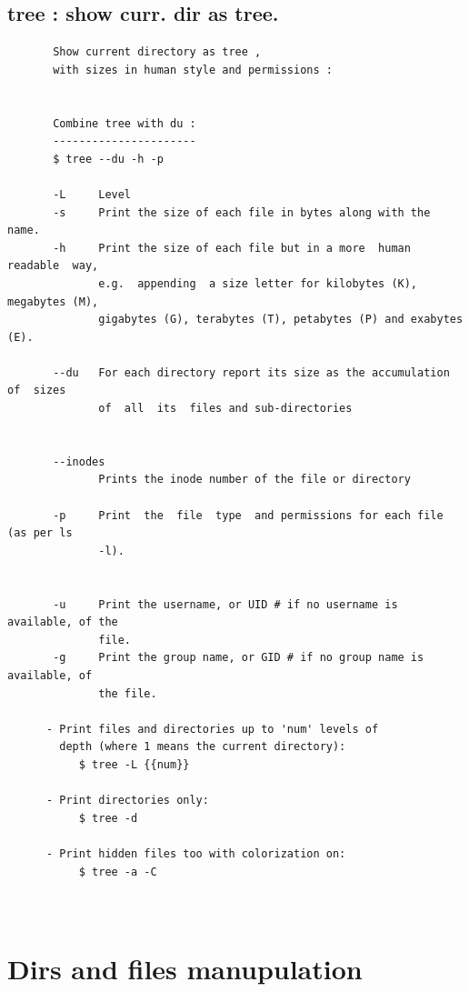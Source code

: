 \documentclass[a4paper,12pt]{article}
\begin{document}
\subsection{tree    : show curr. dir as tree.}
\begin{verbatim}
       Show current directory as tree , 
       with sizes in human style and permissions : 
       
       
       Combine tree with du : 
       ----------------------        
       $ tree --du -h -p       
       
       -L     Level
       -s     Print the size of each file in bytes along with the name.
       -h     Print the size of each file but in a more  human  readable  way,
              e.g.  appending  a size letter for kilobytes (K), megabytes (M),
              gigabytes (G), terabytes (T), petabytes (P) and exabytes (E).             
       
       --du   For each directory report its size as the accumulation of  sizes
              of  all  its  files and sub-directories
              

       --inodes
              Prints the inode number of the file or directory
       
       -p     Print  the  file  type  and permissions for each file (as per ls
              -l).
     
       
       -u     Print the username, or UID # if no username is available, of the
              file.
       -g     Print the group name, or GID # if no group name is available, of
              the file.
            
      - Print files and directories up to 'num' levels of 
        depth (where 1 means the current directory):
           $ tree -L {{num}}

      - Print directories only:
           $ tree -d

      - Print hidden files too with colorization on:
           $ tree -a -C
       
       
\end{verbatim}


\section{Dirs and files manupulation}
\end{document}
